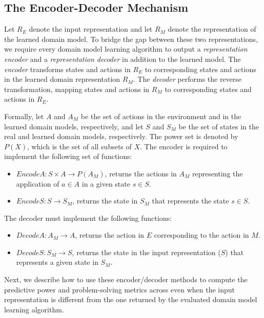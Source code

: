\documentclass{article}
\theoremstyle{definition}
\theoremstyle{remark}
\newcommand{\encodea}{\textit{EncodeA}\xspace}
\newcommand{\encodes}{\textit{EncodeS}\xspace}
\newcommand{\decodea}{\textit{DecodeA}\xspace}
\newcommand{\decodes}{\textit{DecodeS}\xspace}
\newif\ifaddcomments
\newcommand{\roni}[1]{\ifaddcomments{\textcolor{red}{[Roni: #1]}}\fi}
\newcommand{\yarin}[1]{\ifaddcomments{\textcolor{teal}{[Yarin: #1]}}\fi}
\begin{document}



\subsection{The Encoder-Decoder Mechanism}
Let $R_E$ denote the input representation and let $R_M$ denote the representation of the learned domain model. 
To bridge the gap between these two representations, we require every domain model learning algorithm to output 
a \emph{representation encoder} and a \emph{representation decoder} in addition to the learned model. 
The \emph{encoder} transforms states and actions in $R_E$ to corresponding states and actions in the learned domain representation $R_M$. 
The \emph{decoder} performs the reverse transformation, mapping states and actions in $R_M$ to corresponding states and actions in $R_E$.


Formally, let $A$ and $A_M$ be the set of actions in the environment and in the learned domain models, respectively, and let $S$ and $S_M$ be the set of states in the real and learned domain models, respectively. The power set is denoted by $P(X)$, which is the set of all subsets of $X$. 
The encoder is required to implement the following set of functions:
\begin{itemize}
    \item $\encodea: S\times A\rightarrow P(A_M)$, returns the actions in $A_M$ representing the application of $a\in A$ in a given state $s \in S$. 
    \item ${\encodes: S\rightarrow S_M}$, returns the state in $S_M$ that represents the state $s\in S$. 
\end{itemize}
The decoder must implement the following functions:
\begin{itemize}
    \item ${\decodea: A_M\rightarrow A}$, returns the action in $E$ corresponding to the action in $M$. 
    \item ${\decodes: S_M\rightarrow S}$, returns the state in the input representation ($S$) that represents a given state in $S_M$. 
    \yarin{returns the state $s \in S_M$ as its representation in $S$}
\end{itemize}
Next, we describe how to use these encoder/decoder methods to compute the predictive power and problem-solving metrics across even when the input representation is different from the one returned by the evaluated domain model learning algorithm.
\end{document}
